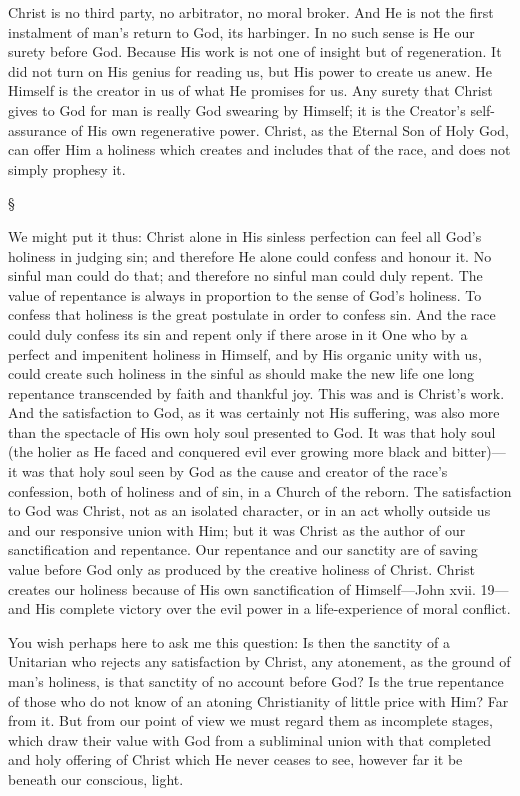 \documentclass[12pt,letterpaper,oneside]{book}
\begin{document}
Christ is no third party, no arbitrator, no 
moral broker. And He is not the first instalment 
of man's return to God, its harbinger. In 
no such sense is He our surety before God. 
Because His work is not one of insight but 
of regeneration. It did not turn on His genius 
for reading us, but His power to create us 
anew. He Himself is the creator in us of 
what He promises for us. Any surety that 
Christ gives to God for man is really God swearing 
by Himself; it is the Creator's self-assurance 
of His own regenerative power. Christ, as the 
Eternal Son of Holy God, can offer Him a holiness 
which creates and includes that of the race, 
and does not simply prophesy it. 

\begin{center}
\S
\end{center}

We might put it thus: Christ alone in His 
sinless perfection can feel all God's holiness in 
judging sin; and therefore He alone could 
confess and honour it. No sinful man could do 
that; and therefore no sinful man could duly 
repent. The value of repentance is always in 
proportion to the sense of God's holiness. To 
confess that holiness is the great postulate in 
order to confess sin. And the race could duly 
confess its sin and repent only if there arose in it 
One who by a perfect and impenitent holiness in 
Himself, and by His organic unity with us, could 
create such holiness in the sinful as should make 
the new life one long repentance transcended by 
faith and thankful joy. This was and is Christ's 
work. And the satisfaction to God, as it was 
certainly not His suffering, was also more than 
the spectacle of His own holy soul presented to 
God. It was that holy soul (the holier as He 
faced and conquered evil ever growing more 
black and bitter)---it was that holy soul seen 
by God as the cause and creator of the race's 
confession, both of holiness and of sin, in a 
Church of the reborn. The satisfaction to God 
was Christ, not as an isolated character, or in 
an act wholly outside us and our responsive 
union with Him; but it was Christ as the 
author of our sanctification and repentance. 
Our repentance and our sanctity are of saving 
value before God only as produced by the creative 
holiness of Christ. Christ creates our holiness 
because of His own sanctification of Himself---John 
xvii. 19---and His complete victory over 
the evil power in a life-experience of moral 
conflict. 

You wish perhaps here to ask me this question: 
Is then the sanctity of a Unitarian who rejects 
any satisfaction by Christ, any atonement, as the 
ground of man's holiness, is that sanctity of no 
account before God? Is the true repentance of 
those who do not know of an atoning Christianity 
of little price with Him? Far from it. But from 
our point of view we must regard them as incomplete 
stages, which draw their value with 
God from a subliminal union with that completed 
and holy offering of Christ which He never ceases 
to see, however far it be beneath our conscious, 
light. 
\end{document}
